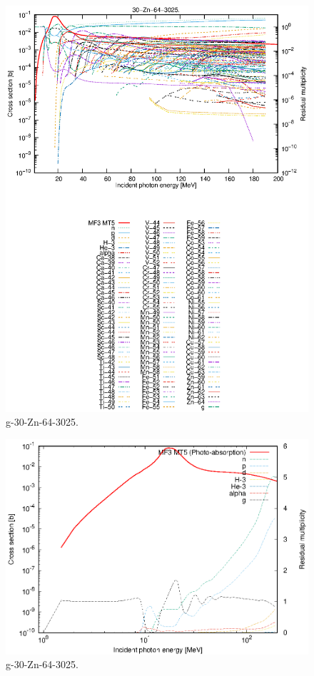 \begin{figure}
 \includegraphics[width=\linewidth]{eps/g_30-Zn-64_3025.eps}
  \caption{g-30-Zn-64-3025.}
\end{figure}
\newpage \clearpage

\begin{figure}
 \includegraphics[width=\linewidth]{eps-log/g_30-Zn-64_3025.eps}
 \caption{g-30-Zn-64-3025.}
\end{figure}
\newpage \clearpage

